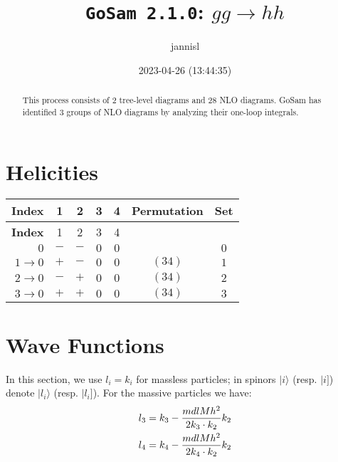 \documentclass[a4paper]{article}
\title{\texttt{GoSam 2.1.0}: ${g}{g}\rightarrow{h}{h}$}
\author{jannisl}
\date{2023-04-26 (13:44:35)}
\newcommand{\kea}[1]{\vert #1 \rangle}
\newcommand{\keb}[1]{\vert #1 ]}
\begin{document}
\maketitle
\begin{abstract}
\noindent This process consists of 2 tree-level diagrams and 28 NLO diagrams. GoSam has identified 3 groups  of NLO diagrams by analyzing their one-loop integrals.
\end{abstract}
\newpage
\tableofcontents
\newpage

\section{Helicities}

\begin{longtable}[c]{r|cccc|c|c}
\bf{Index} &1&2&3&4 & Permutation & Set\\
\hline
\endfirsthead
\bf{Index} &1&2&3&4\\
\hline
\endhead 
$0$& $-$& $-$& $0$& $0$ &  & $0$ \\
$1\rightarrow 0$& $+$& $-$& $0$& $0$ & $(34)$ & $1$ \\
$2\rightarrow 0$& $-$& $+$& $0$& $0$ & $(34)$ & $2$ \\
$3\rightarrow 0$& $+$& $+$& $0$& $0$ & $(34)$ & $3$ \\
\end{longtable}
\section{Wave Functions}
In this section, we use $l_i=k_i$ for massless particles;
in spinors $\kea{i}$ (resp. $\keb{i}$) denote $\kea{l_i}$ (resp. $\keb{l_i}$).
For the massive particles we have:
\begin{align}
l_{3} &= k_{3} - \frac{mdlMh^2}{%
      2 k_{3}\cdot k_{2}}k_{2}\\
l_{4} &= k_{4} - \frac{mdlMh^2}{%
      2 k_{4}\cdot k_{2}}k_{2}
\end{align}
\end{document}
